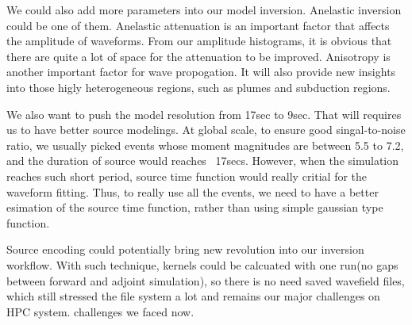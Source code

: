 We could also add more parameters into our model inversion. Anelastic inversion
could be one of them. Anelastic attenuation is an important factor that affects
the amplitude of waveforms. From our amplitude histograms, it is obvious that 
there are quite a lot of space for the attenuation to be improved. Anisotropy
is another important factor for wave propogation. It will also provide new insights
into those higly heterogeneous regions, such as plumes and subduction regions.

We also want to push the model resolution from 17sec to 9sec. That will requires us
to have better source modelings. At global scale,
to ensure good singal-to-noise ratio, we usually picked events whose moment
magnitudes are between 5.5 to 7.2, and the duration of source would reaches ~17secs.
However, when the simulation reaches such short period, source time function
would really critial for the waveform fitting. Thus, to really use all the events,
we need to have a better esimation of the source time function, rather than using
simple gaussian type function.

Source encoding could potentially bring new revolution into our inversion workflow. With such
technique, kernels could be calcuated with one run(no gaps between forward and adjoint
simulation), so there is no need saved wavefield files, which still stressed the file system
a lot and remains our major challenges on HPC system.
challenges we faced now.
